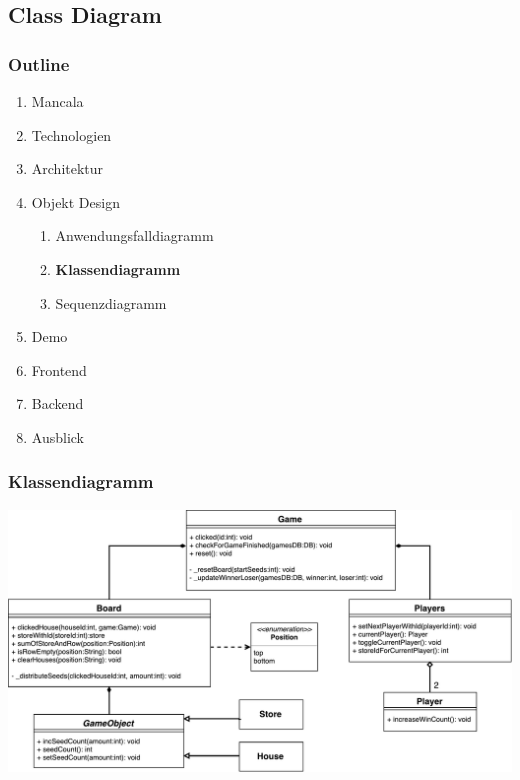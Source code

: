 \documentclass[
	10pt,
	t		%
]{beamer}
\begin{document}
\subsection{Class Diagram}
\begin{frame}
\frametitle{Outline}
\begin{enumerate}
\item Mancala
\item Technologien
\item Architektur
\item Objekt Design
\begin{enumerate}
\item Anwendungsfalldiagramm
\item \textbf{Klassendiagramm}
\item Sequenzdiagramm
\end{enumerate}
\item Demo
\item Frontend
\item Backend
\item Ausblick
\end{enumerate}
\end{frame}

\begin{frame}
\frametitle{Klassendiagramm}
\begin{center}
\includegraphics[scale=0.32]{./../Diagrams/Classes.pdf}
\end{center}
\end{frame}
\end{document}
